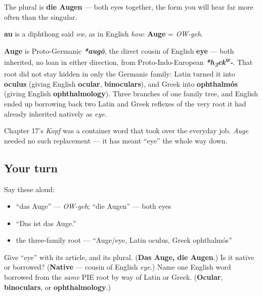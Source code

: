 The plural is \textbf{die Augen} — both eyes together, the form you will hear far more often than the singular.

\begin{sounds}
\textbf{au} is a diphthong said \emph{ow}, as in English \emph{how}: \textbf{Auge} = \emph{OW-geh}.
\end{sounds}

\begin{cousinweb}
\textbf{Auge} is Proto-Germanic \emph{\textbf{*augô}}, the direct cousin of English \textbf{eye} — both inherited, no loan in either direction, from Proto-Indo-European \emph{\textbf{*h\textsubscript{3}ek\textsuperscript{w}-}}. That root did not stay hidden in only the Germanic family: Latin turned it into \textbf{oculus} (giving English \textbf{ocular}, \textbf{binoculars}), and Greek into \textbf{ophthalmós} (giving English \textbf{ophthalmology}). Three branches of one family tree, and English ended up borrowing back two Latin and Greek reflexes of the very root it had already inherited natively as \emph{eye}.

Chapter 17's \emph{Kopf} was a container word that took over the everyday job. \emph{Auge} needed no such replacement — it has meant \textquotedblleft{}eye\textquotedblright{} the whole way down.
\end{cousinweb}

\subsection*{Your turn}
Say these aloud:

\begin{itemize}
\raggedright
  \item \textquotedblleft{}das Auge\textquotedblright{} — \emph{OW-geh}; \textquotedblleft{}die Augen\textquotedblright{} — both eyes
  \item \textquotedblleft{}Das ist das Auge.\textquotedblright{}
  \item the three-family root — \textquotedblleft{}Auge/eye, Latin oculus, Greek ophthalmós\textquotedblright{}
\end{itemize}

\begin{tcolorbox}[breakable,colback=teal!4,colframe=teal!35!black,title={Before you move on}]
Give \textquotedblleft{}eye\textquotedblright{} with its article, and its plural. (\textbf{Das Auge, die Augen}.) Is it native or borrowed? (\textbf{Native} — cousin of English \emph{eye}.) Name one English word borrowed from the \emph{same} PIE root by way of Latin or Greek. (\textbf{Ocular}, \textbf{binoculars}, or \textbf{ophthalmology}.)
\end{tcolorbox}
